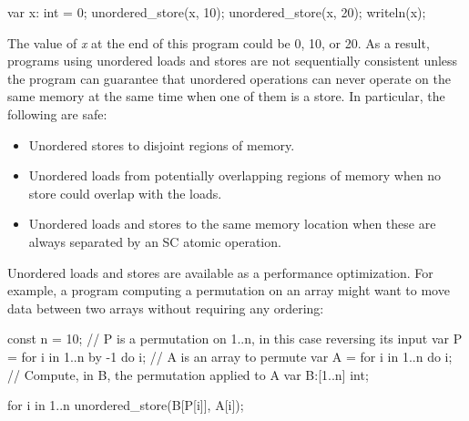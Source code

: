 \begin{chapel}
var x: int = 0;
unordered_store(x, 10);
unordered_store(x, 20);
writeln(x);
\end{chapel}

The value of \textit{x} at the end of this program could be 0, 10, or 20. As a
result, programs using unordered loads and stores are not sequentially
consistent unless the program can guarantee that unordered operations
can never operate on the same memory at the same time when one of them is a
store. In particular, the following are safe:

\begin{itemize}
  \item Unordered stores to disjoint regions of memory.
  \item Unordered loads from potentially overlapping regions of memory when no store could overlap with the loads.
  \item Unordered loads and stores to the same memory location
  when these are always separated by an SC atomic operation.
\end{itemize}

Unordered loads and stores are available as a performance
optimization. For example, a program computing a permutation on an array might
want to move data between two arrays without requiring any ordering:

\begin{chapel}
const n = 10;
// P is a permutation on 1..n, in this case reversing its input
var P = for i in 1..n by -1 do i;
// A is an array to permute
var A = for i in 1..n do i;
// Compute, in B, the permutation applied to A
var B:[1..n] int;

for i in 1..n {
  unordered_store(B[P[i]], A[i]);
}
\end{chapel}



